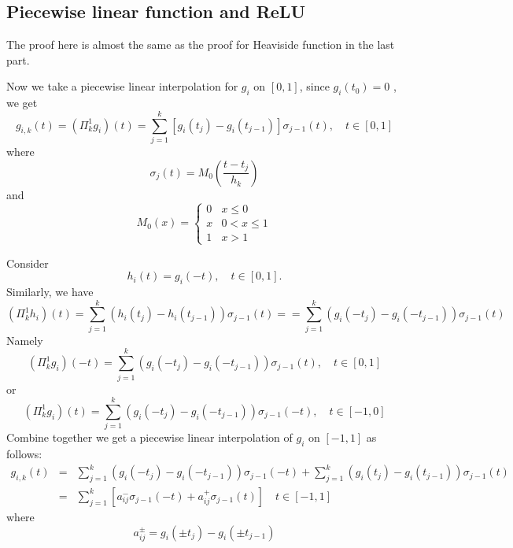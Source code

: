 \subsection{Piecewise linear function and ReLU}
The proof here is almost the same as the proof for Heaviside function in the last part. 

Now we take a piecewise linear interpolation for $g_i$ on $[0,1]$, since $g_i(t_0)=0$ , we get
$$
g_{i,k}(t)=(\Pi_k^1g_i)(t)=\sum_{j=1}^{k}[g_i(t_{j})-g_i(t_{j-1})]\sigma_{j-1}(t),   \quad t\in [0,1]
$$
where
$$
\sigma_j(t)=M_0(\frac{t-t_j}{h_k})
$$
and
\begin{equation}
	\label{cardinal}
	M_0(x)=
	\left\{
	\begin{array}{ll}
		0 & x\le0 \\
		x & 0< x\le1    \\
		1 & x > 1    
	\end{array}
	\right.
\end{equation}

Consider
\begin{equation}
	h_i(t) = g_i(-t), \quad t\in [0,1].
\end{equation}
Similarly, we have
$$
(\Pi_k^1h_i)(t)=\sum_{j=1}^{k}(h_i(t_j) - h_i(t_{j-1}))\sigma_{j-1}(t)=
=\sum_{j=1}^{k}(g_i(-t_j) - g_i(-t_{j-1}))\sigma_{j-1}(t)
$$
Namely
$$
(\Pi_k^1 g_i)(-t)=\sum_{j=1}^{k}(g_i(-t_j) - g_i(-t_{j-1}))\sigma_{j-1}(t), \quad t\in [0,1]
$$
or
\begin{equation}\label{gi1}
	(\Pi_k^1 g_i)(t)=\sum_{j=1}^{k}(g_i(-t_j) - g_i(-t_{j-1}))\sigma_{j-1}(-t), \quad t\in [-1,0]
\end{equation}
Combine together we get a piecewise linear
interpolation of $g_i$ on $[-1,1]$ as follows:
\begin{eqnarray}
	g_{i,k}(t)&=&
	\sum_{j=1}^{k}(g_i(-t_j) - g_i(-t_{j-1}))\sigma_{j-1}(-t)+\sum_{j=1}^{k}(g_i(t_j) - g_i(t_{j-1}))\sigma_{j-1}(t)\nonumber \\ 
	&=&\sum_{j=1}^{k}[a_{ij}^-\sigma_{j-1}(-t)+a_{ij}^+\sigma_{j-1}(t)] \label{gih}
	\quad t\in [-1,1]
\end{eqnarray}
where 
$$
a_{ij}^{\pm}=g_i(\pm t_j) - g_i(\pm t_{j-1})
$$
%


